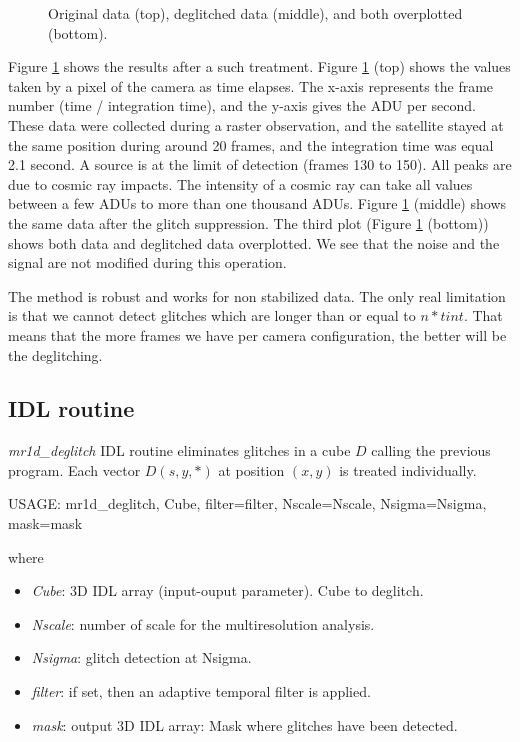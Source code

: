 \begin{figure}[htb]
\centerline{
\vbox{
}}
\caption{Original data (top), deglitched data (middle), and both overplotted 
(bottom).}
\label{fig_deglitch2}
\end{figure}

Figure \ref{fig_deglitch2} shows the results after
a such treatment. Figure \ref{fig_deglitch2} (top) shows the values 
taken by a pixel of the camera as time elapses. The x-axis represents the frame 
number (time / integration time), and the y-axis gives the ADU per second. These
data were collected during a raster observation, and the satellite stayed at the 
same 
position during around 20 frames, and the integration time was equal 2.1 second. A 
source is at the limit of detection  (frames 130 to 150). All peaks 
are due to cosmic ray impacts. The intensity of a cosmic ray can take all
values between a few ADUs to more than one thousand ADUs. Figure 
\ref{fig_deglitch2} 
(middle) shows the same data after the glitch suppression.
The third plot (Figure \ref{fig_deglitch2} (bottom)) shows both data and 
deglitched data overplotted.
 We see that the noise
and the signal are not modified during this operation. 

The method is robust and works for non stabilized data. The only real limitation 
is that we 
cannot detect glitches which are longer than or equal to $n*tint$. That
means that the more frames we have per camera configuration, the 
better will be the deglitching. 

\subsection*{IDL routine}
{\em mr1d\_deglitch} IDL routine eliminates glitches in 
a cube $D$ calling the previous program. Each vector $D(s,y,*)$
at position $(x,y)$ is treated individually. 
\begin{center}
     USAGE: mr1d\_deglitch, Cube, filter=filter, Nscale=Nscale, Nsigma=Nsigma, mask=mask
\end{center}
where 
\begin{itemize}
\item {\em Cube}: 3D IDL array (input-ouput parameter). Cube to deglitch.
\item {\em Nscale}: number of scale for the multiresolution analysis.
\item {\em Nsigma}: glitch detection at Nsigma.
\item {\em filter}: if set, then an adaptive temporal filter is applied.
\item {\em mask}: output 3D IDL array: Mask where glitches have been detected.
\end{itemize}


